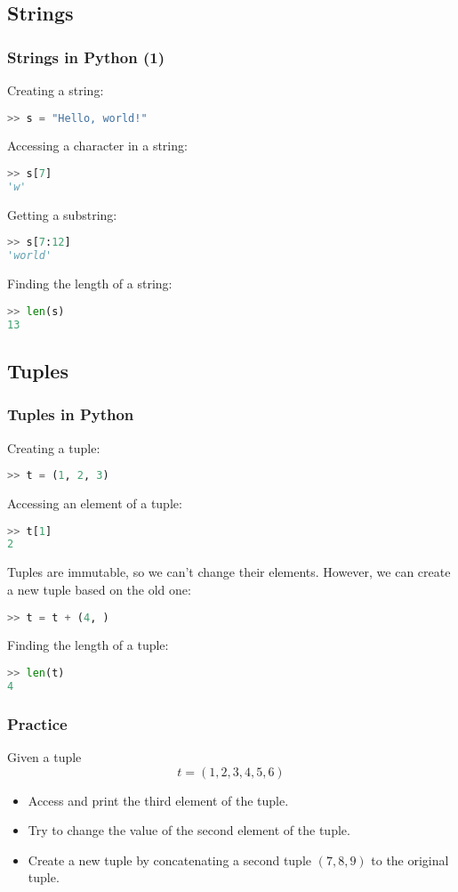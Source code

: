 \subsection*{Strings}
\begin{frame}[fragile]
  \frametitle{Strings in Python (1)}
  Creating a string:
  \begin{lstlisting}[language=Python]
>> s = "Hello, world!"
  \end{lstlisting}\pause
  Accessing a character in a string:
  \begin{lstlisting}[language=Python]
>> s[7]
'w'
  \end{lstlisting}\pause
  Getting a substring:
  \begin{lstlisting}[language=Python]
>> s[7:12]
'world'
  \end{lstlisting}\pause
  Finding the length of a string:
  \begin{lstlisting}[language=Python]
>> len(s)
13
  \end{lstlisting}
\end{frame}

\subsection*{Tuples}
\begin{frame}[fragile]
  \frametitle{Tuples in Python}
  Creating a tuple:
  \begin{lstlisting}[language=Python]
>> t = (1, 2, 3)
  \end{lstlisting}\pause
  Accessing an element of a tuple:
  \begin{lstlisting}[language=Python]
>> t[1]
2
  \end{lstlisting}\pause
  Tuples are immutable, so we can't change their elements. However, we can create a new tuple based on the old one:
  \begin{lstlisting}[language=Python]
>> t = t + (4, )
  \end{lstlisting}\pause
  Finding the length of a tuple:
  \begin{lstlisting}[language=Python]
>> len(t)
4
  \end{lstlisting}
\end{frame}

\begin{frame}[fragile]
  \frametitle{Practice}
  Given a tuple
  \[
     t = (1, 2, 3, 4, 5, 6)
  \]
  \begin{itemize}
   \item Access and print the third element of the tuple.\pause
   \item Try to change the value of the second element of the tuple.\pause
   \item Create a new tuple by concatenating a second tuple \((7, 8, 9)\) to the original tuple.
  \end{itemize}
 \end{frame}



